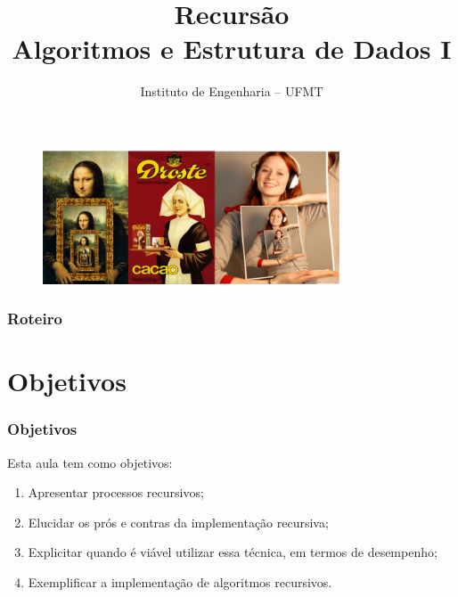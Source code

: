 \documentclass[aspectratio=169]{beamer}
\title[Recursão]{Recursão\\
   Algoritmos e Estrutura de Dados I}
\author[IEng - UFMT]{Instituto de Engenharia -- UFMT}
\date{}
\begin{document}
\begin{frame}

\titlepage %

\begin{figure}[!h]
  \centering
  \includegraphics[width=250pt]{imgs/introducao.png}
  \label{fig_introducao}
\end{figure}

\end{frame}


\begin{frame}
\frametitle{Roteiro} %
\tableofcontents %
\end{frame}


\section{Objetivos}

\begin{frame}
\frametitle{Objetivos}

Esta aula tem como objetivos:

\begin{enumerate}
\item Apresentar processos recursivos;
\item Elucidar os prós e contras da implementação recursiva;
\item Explicitar quando é viável utilizar essa técnica, em termos de desempenho;
\item Exemplificar a implementação de algoritmos recursivos.
\end{enumerate}

\end{frame}
\end{document}
